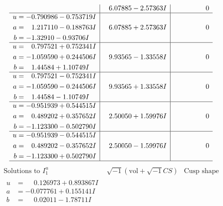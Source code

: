 \documentclass[1p]{elsarticle_modified}
\theoremstyle{definition}
\newcommand{\I}{\sqrt{-1}}
\begin{document}
$$\begin{array}{c|c|c}
 & \phantom{-}6.07885 - 2.57363 I & \phantom{-0.000000 } 0 \\ \hline\begin{aligned}
u &= -0.790986 - 0.753719 I \\
a &= \phantom{-}1.217110 - 0.188763 I \\
b &= -1.32910 - 0.93706 I\end{aligned}
 & \phantom{-}6.07885 + 2.57363 I & \phantom{-0.000000 } 0 \\ \hline\begin{aligned}
u &= \phantom{-}0.797521 + 0.752341 I \\
a &= -1.059590 + 0.244506 I \\
b &= \phantom{-}1.44584 + 1.10749 I\end{aligned}
 & \phantom{-}9.93565 - 1.33558 I & \phantom{-0.000000 } 0 \\ \hline\begin{aligned}
u &= \phantom{-}0.797521 - 0.752341 I \\
a &= -1.059590 - 0.244506 I \\
b &= \phantom{-}1.44584 - 1.10749 I\end{aligned}
 & \phantom{-}9.93565 + 1.33558 I & \phantom{-0.000000 } 0 \\ \hline\begin{aligned}
u &= -0.951939 + 0.544515 I \\
a &= \phantom{-}0.489202 + 0.357652 I \\
b &= -1.123300 - 0.502790 I\end{aligned}
 & \phantom{-}2.50050 + 1.59976 I & \phantom{-0.000000 } 0 \\ \hline\begin{aligned}
u &= -0.951939 - 0.544515 I \\
a &= \phantom{-}0.489202 - 0.357652 I \\
b &= -1.123300 + 0.502790 I\end{aligned}
 & \phantom{-}2.50050 - 1.59976 I & \phantom{-0.000000 } 0\\
 \hline 
 \end{array}$$\newpage$$\begin{array}{c|c|c}  
\text{Solutions to }I^u_{1}& \I (\text{vol} + \sqrt{-1}CS) & \text{Cusp shape}\\
 \hline 
\begin{aligned}
u &= \phantom{-}0.126973 + 0.893867 I \\
a &= -0.077761 + 0.155141 I \\
b &= \phantom{-}0.02011 - 1.78711 I\end{aligned}

\end{array}$$
\end{document}

